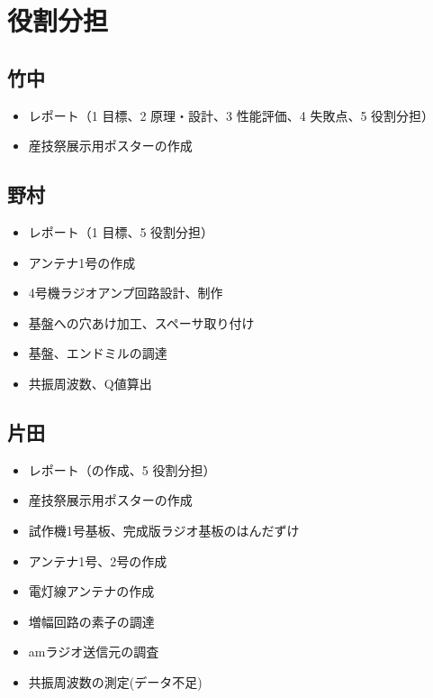 \documentclass[report.tex]{subfiles}
\begin{document}
\section{役割分担}

\subsection{竹中}

\begin{itemize}
	\item レポート（1 目標、2 原理・設計、3 性能評価、4 失敗点、5 役割分担）
	\item 産技祭展示用ポスターの作成
\end{itemize}

\subsection{野村}

\begin{itemize}
	\item レポート（1 目標、5 役割分担）
	\item アンテナ1号の作成
	\item 4号機ラジオアンプ回路設計、制作
	\item 基盤への穴あけ加工、スペーサ取り付け
	\item 基盤、エンドミルの調達
	\item 共振周波数、Q値算出
\end{itemize}

\subsection{片田}

\begin{itemize}
	\item レポート（の作成、5 役割分担）
	\item 産技祭展示用ポスターの作成
	\item 試作機1号基板、完成版ラジオ基板のはんだずけ
	\item アンテナ1号、2号の作成
	\item 電灯線アンテナの作成
	\item 増幅回路の素子の調達
	\item amラジオ送信元の調査
	\item 共振周波数の測定(データ不足)
\end{itemize}
\end{document}
